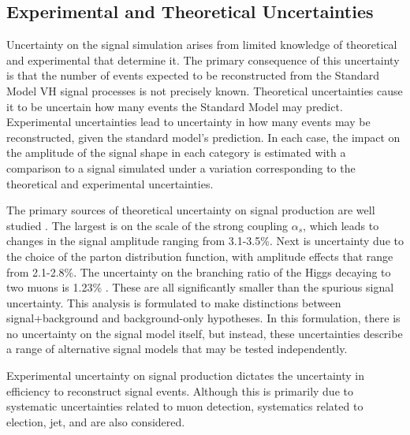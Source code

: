 \subsection{Experimental and Theoretical Uncertainties}

Uncertainty on the signal simulation arises from limited knowledge of theoretical and experimental that determine it. 
The primary consequence of this uncertainty is that the number of events expected to be reconstructed from the Standard Model VH signal processes is not precisely known.
Theoretical uncertainties cause it to be uncertain how many events the Standard Model may predict.
Experimental uncertainties lead to uncertainty in how many events may be reconstructed, given the standard model's prediction.
In each case, the impact on the amplitude of the signal shape in each category is estimated with a comparison to a signal simulated under a variation corresponding to the theoretical and experimental uncertainties.

The primary sources of theoretical uncertainty on signal production are well studied \cite{higgsCross}.
The largest is on the scale of the strong coupling $\alpha_s$, which leads to changes in the signal amplitude ranging from 3.1-3.5\%.
Next is uncertainty due to the choice of the parton distribution function, with amplitude effects that range from 2.1-2.8\%.
The uncertainty on the branching ratio of the Higgs decaying to two muons is 1.23\% \cite{higgsCross}.
These are all significantly smaller than the spurious signal uncertainty.
This analysis is formulated to make distinctions between signal+background and background-only hypotheses.
In this formulation, there is no uncertainty on the signal model itself, but instead, these uncertainties describe a range of alternative signal models that may be tested independently.

Experimental uncertainty on signal production dictates the uncertainty in efficiency to reconstruct signal events. 
Although this is primarily due to systematic uncertainties related to muon detection, systematics related to election, jet, and \met are also considered.

